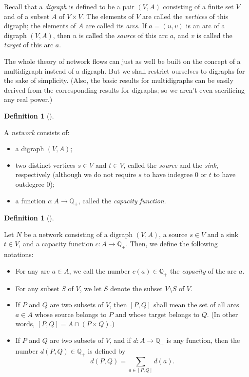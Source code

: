 \documentclass[numbers=enddot,12pt,final,onecolumn,notitlepage]{scrartcl}%
\theoremstyle{definition}
\newtheorem{defi}[theo]{Definition}
\newenvironment{definition}[1][]
{\begin{defi}[#1]\begin{leftbar}}
{\end{leftbar}\end{defi}}
\let\sumnonlimits\sum
\renewcommand{\sum}{\sumnonlimits\limits}
\begin{document}
Recall that a \textit{digraph} is defined to be a pair $\left(  V,A\right)  $
consisting of a finite set $V$ and of a subset $A$ of $V\times V$. The
elements of $V$ are called the \textit{vertices} of this digraph; the elements
of $A$ are called its \textit{arcs}. If $a=\left(  u,v\right)  $ is an arc of
a digraph $\left(  V,A\right)  $, then $u$ is called the \textit{source} of
this arc $a$, and $v$ is called the \textit{target} of this arc $a$.

The whole theory of network flows can just as well be built on the concept of
a multidigraph instead of a digraph. But we shall restrict ourselves to
digraphs for the sake of simplicity. (Also, the basic results for
multidigraphs can be easily derived from the corresponding results for
digraphs; so we aren't even sacrificing any real power.)

\begin{definition}
\label{def.network.basics}A \textit{network} consists of:

\begin{itemize}
\item a digraph $\left(  V,A\right)  $;

\item two distinct vertices $s\in V$ and $t\in V$, called the \textit{source}
and the \textit{sink}, respectively (although we do not require $s$ to have
indegree $0$ or $t$ to have outdegree $0$);

\item a function $c:A\rightarrow\mathbb{Q}_{+}$, called the \textit{capacity
function}.
\end{itemize}
\end{definition}

\begin{definition}
\label{def.network.notations}Let $N$ be a network consisting of a digraph
$\left(  V,A\right)  $, a source $s\in V$ and a sink $t\in V$, and a capacity
function $c:A\rightarrow\mathbb{Q}_{+}$. Then, we define the following notations:

\begin{itemize}
\item For any arc $a\in A$, we call the number $c\left(  a\right)
\in\mathbb{Q}_{+}$ the \textit{capacity} of the arc $a$.

\item For any subset $S$ of $V$, we let $\overline{S}$ denote the subset
$V\setminus S$ of $V$.

\item If $P$ and $Q$ are two subsets of $V$, then $\left[  P,Q\right]  $ shall
mean the set of all arcs $a\in A$ whose source belongs to $P$ and whose target
belongs to $Q$. (In other words, $\left[  P,Q\right]  =A\cap\left(  P\times
Q\right)  $.)

\item If $P$ and $Q$ are two subsets of $V$, and if $d:A\rightarrow
\mathbb{Q}_{+}$ is any function, then the number $d\left(  P,Q\right)
\in\mathbb{Q}_{+}$ is defined by
\[
d\left(  P,Q\right)  =\sum_{a\in\left[  P,Q\right]  }d\left(  a\right)  .
\]

\end{itemize}
\end{definition}
\end{document}
